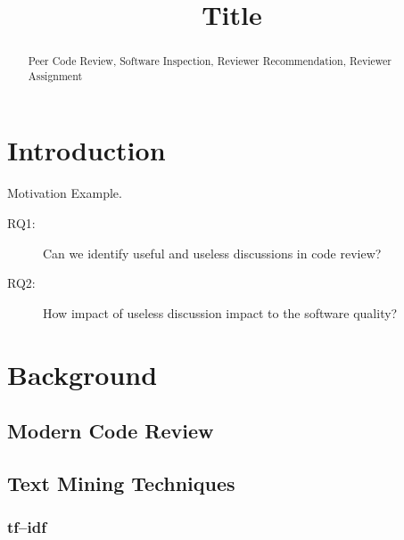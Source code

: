 \documentclass[conference]{IEEEtran}
\begin{document}
\title{Title}

\maketitle
{}
{\newcommand{\nbnote}[2]{
  \fcolorbox{blue}{yellow}{\bfseries\sffamily\scriptsize#1}
  {\sf\small\textit{#2}}
 }
}
{\newcommand{\nbnote}[2]{}
 \newcommand{\version}{}
}
\newcommand\pick[1]{\nbnote{Pick sez}{\textcolor{magenta}{#1}}}
\newcommand\thai[1]{\nbnote{Thai sez}{\textcolor{blue}{#1}}}


\begin{abstract}




\begin{IEEEkeywords}
Peer Code Review, Software Inspection, Reviewer Recommendation, Reviewer Assignment
\end{IEEEkeywords}
\end{abstract}

\section{Introduction}
Motivation Example.\thai{Wow}
\begin{description}
\item[RQ1:] Can we identify useful and useless discussions in code review?
\item[RQ2:] How impact of useless discussion impact to the software quality?
\end{description}

\section{Background}
\subsection{Modern Code Review}
\subsection{Text Mining Techniques}
\subsubsection{tf--idf}
\end{document}
